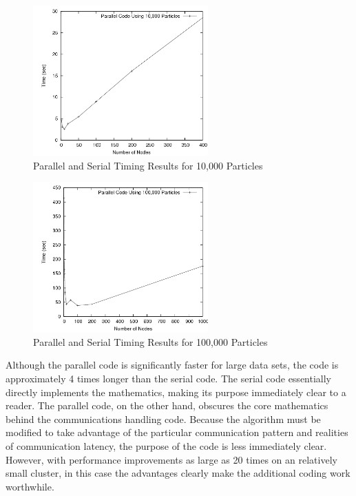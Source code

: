 \documentclass{article}
\begin{document}
\begin{figure}
\centering
\includegraphics[width=0.6\textwidth]{img/timing_data_10000_particles.png}
\caption{Parallel and Serial Timing Results for 10,000 Particles}
\label{chart2}
\end{figure}

\begin{figure}
\centering
\includegraphics[width=0.6\textwidth]{img/timing_data_100000_particles.png}
\caption{Parallel and Serial Timing Results for 100,000 Particles}
\label{chart3}
\end{figure}

Although the parallel code is significantly faster for large data sets, the code is approximately 4 times longer than the serial code. The serial code essentially directly implements the mathematics, making its purpose immediately clear to a reader. The parallel code, on the other hand, obscures the core mathematics behind the communications handling code. Because the algorithm must be modified to take advantage of the particular communication pattern and realities of communication latency, the purpose of the code is less immediately clear. However, with performance improvements as large as 20 times on an relatively small cluster, in this case the advantages clearly make the additional coding work worthwhile.
\end{document}
